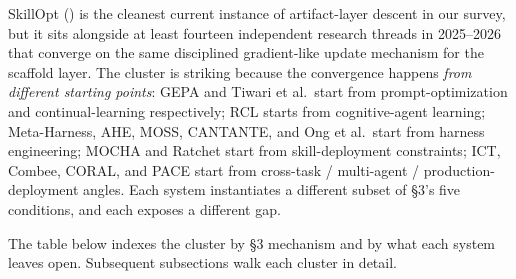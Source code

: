 \documentclass[
]{article}
\begin{document}
SkillOpt () is the
cleanest current instance of artifact-layer descent in our survey, but
it sits alongside at least fourteen independent research threads in
2025--2026 that converge on the same disciplined gradient-like update
mechanism for the scaffold layer. The cluster is striking because the
convergence happens \emph{from different starting points}: GEPA and
Tiwari et al.~start from prompt-optimization and continual-learning
respectively; RCL starts from cognitive-agent learning; Meta-Harness,
AHE, MOSS, CANTANTE, and Ong et al.~start from harness engineering;
MOCHA and Ratchet start from skill-deployment constraints; ICT, Combee,
CORAL, and PACE start from cross-task / multi-agent /
production-deployment angles. Each system instantiates a different
subset of §3's five conditions, and each exposes a different gap.

The table below indexes the cluster by §3 mechanism and by what each
system leaves open. Subsequent subsections walk each cluster in detail.
\end{document}
